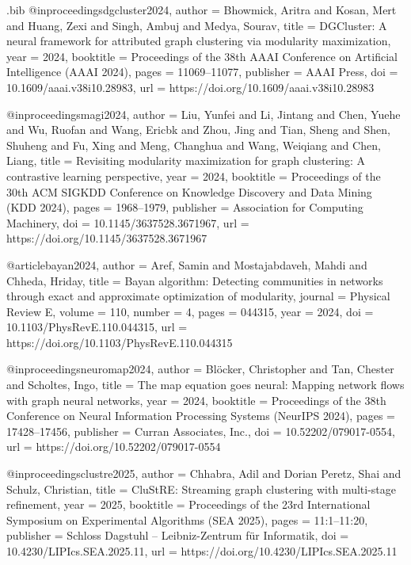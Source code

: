 \documentclass[11pt,a4paper]{article}
\begin{document}
\begin{filecontents*}[overwrite]{\jobname.bib}
@inproceedings{dgcluster2024,
  author    = {Bhowmick, Aritra and Kosan, Mert and Huang, Zexi and Singh, Ambuj and Medya, Sourav},
  title     = {{DGCluster}: A neural framework for attributed graph clustering via modularity maximization},
  year      = {2024},
  booktitle = {Proceedings of the 38th AAAI Conference on Artificial Intelligence (AAAI 2024)},
  pages     = {11069--11077},
  publisher = {AAAI Press},
  doi       = {10.1609/aaai.v38i10.28983},
  url       = {https://doi.org/10.1609/aaai.v38i10.28983}
}

@inproceedings{magi2024,
  author    = {Liu, Yunfei and Li, Jintang and Chen, Yuehe and Wu, Ruofan and Wang, Ericbk and Zhou, Jing and Tian, Sheng and Shen, Shuheng and Fu, Xing and Meng, Changhua and Wang, Weiqiang and Chen, Liang},
  title     = {Revisiting modularity maximization for graph clustering: A contrastive learning perspective},
  year      = {2024},
  booktitle = {Proceedings of the 30th ACM SIGKDD Conference on Knowledge Discovery and Data Mining (KDD 2024)},
  pages     = {1968--1979},
  publisher = {Association for Computing Machinery},
  doi       = {10.1145/3637528.3671967},
  url       = {https://doi.org/10.1145/3637528.3671967}
}

@article{bayan2024,
  author  = {Aref, Samin and Mostajabdaveh, Mahdi and Chheda, Hriday},
  title   = {Bayan algorithm: Detecting communities in networks through exact and approximate optimization of modularity},
  journal = {Physical Review E},
  volume  = {110},
  number  = {4},
  pages   = {044315},
  year    = {2024},
  doi     = {10.1103/PhysRevE.110.044315},
  url     = {https://doi.org/10.1103/PhysRevE.110.044315}
}

@inproceedings{neuromap2024,
  author    = {Bl{\"o}cker, Christopher and Tan, Chester and Scholtes, Ingo},
  title     = {The map equation goes neural: Mapping network flows with graph neural networks},
  year      = {2024},
  booktitle = {Proceedings of the 38th Conference on Neural Information Processing Systems (NeurIPS 2024)},
  pages     = {17428--17456},
  publisher = {Curran Associates, Inc.},
  doi       = {10.52202/079017-0554},
  url       = {https://doi.org/10.52202/079017-0554}
}

@inproceedings{clustre2025,
  author    = {Chhabra, Adil and Dorian Peretz, Shai and Schulz, Christian},
  title     = {{CluStRE}: Streaming graph clustering with multi-stage refinement},
  year      = {2025},
  booktitle = {Proceedings of the 23rd International Symposium on Experimental Algorithms (SEA 2025)},
  pages     = {11:1--11:20},
  publisher = {Schloss Dagstuhl -- Leibniz-Zentrum f{\"u}r Informatik},
  doi       = {10.4230/LIPIcs.SEA.2025.11},
  url       = {https://doi.org/10.4230/LIPIcs.SEA.2025.11}
}


\end{filecontents*}
\end{document}
